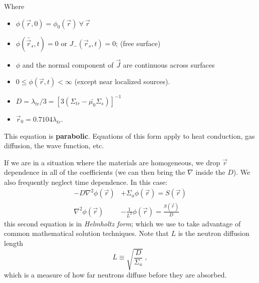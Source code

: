 \documentclass[12pt]{article}
\newcommand{\rvec}{\ensuremath{\vec{r}}}
\begin{document}
Where
\begin{itemize}
\item $\phi(\rvec, 0) = \phi_0(\rvec) \: \forall \: \rvec$
\item $\phi(\tilde{\rvec_s}, t) = 0$ or $J_-(\rvec_s, t) = 0$; (free surface)
\item $\phi$ and the normal component of $\vec{J}$ are continuous across surfaces
\item $0 \leq \phi(\rvec, t) < \infty$ (except near localized sources).
\item $D = \lambda_{tr}/3 = [3(\Sigma_{tr} - \bar{\mu_0}\Sigma_s)]^{-1}$
\item $\rvec_0 = 0.7104 \lambda_{tr}$.
\end{itemize}
This equation is \textbf{parabolic}. Equations of this form apply to heat conduction, gas diffusion, the wave function, etc.

If we are in a situation where the materials are homogeneous, we drop $\rvec$ dependence in all of the coefficients (we can then bring the $\nabla$ inside the $D$). 
We also frequently neglect time dependence. 
In this case:
%
\begin{align*}
-D \nabla^2 \phi(\rvec) &+ \Sigma_a \phi(\rvec) = S(\rvec) \\
\nabla^2 \phi(\rvec) &- \frac{1}{L^2}\phi(\rvec) = \frac{S(\rvec)}{D}
\end{align*}
this second equation is in \textit{Helmholtz form}; which we use to take advantage of common mathematical solution techniques.
Note that $L$ is the neutron diffusion length
\[L \equiv \sqrt{\frac{D}{\Sigma_a}}\:,\]
which is a measure of how far neutrons diffuse before they are absorbed.
\end{document}
